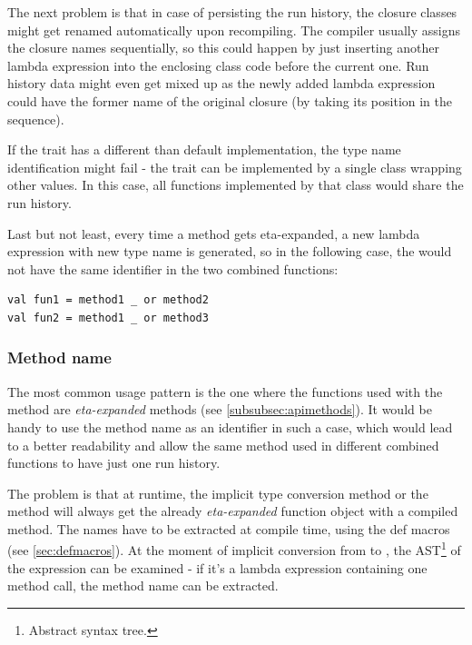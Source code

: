 The next problem is that in case of persisting the run history, the closure classes might get renamed automatically upon recompiling. The compiler usually assigns the closure names sequentially, so this could happen by just inserting another lambda expression into the enclosing class code before the current one. Run history data might even get mixed up as the newly added lambda expression could have the former name of the original closure (by taking its position in the sequence).

If the  trait has a different than default implementation, the type name identification might fail - the trait can be implemented by a single class wrapping other values. In this case, all functions implemented by that class would share the run history.

Last but not least, every time a method gets eta-expanded, a new lambda expression with new type name is generated, so in the following case, the  would not have the same identifier in the two combined functions:

\lstset{style=Scala}
\begin{lstlisting}
val fun1 = method1 _ or method2
val fun2 = method1 _ or method3
\end{lstlisting}

\subsubsection{Method name}
\label{subsec:methodnameident}

The most common usage pattern is the one where the functions used with the  method are \textit{eta-expanded} methods (see \ref{subsubsec:apimethods}). It would be handy to use the method name as an identifier in such a case, which would lead to a better readability and allow the same method used in different combined functions to have just one run history.

The problem is that at runtime, the implicit type conversion method or the  method will always get the already \textit{eta-expanded} function object with a compiled  method. The names have to be extracted at compile time, using the def macros (see \ref{sec:defmacros}). At the moment of implicit conversion from  to , the AST\footnote{Abstract syntax tree.} of the  expression can be examined - if it's a lambda expression containing one method call, the method name can be extracted.

